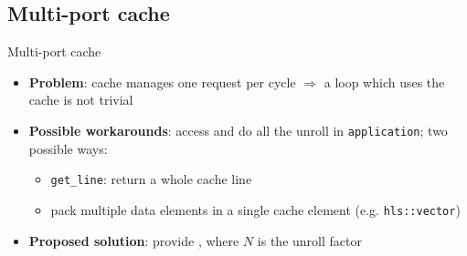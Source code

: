 \documentclass[handout,aspectratio=169]{beamer}
\begin{document}
\subsection{Multi-port cache}
\begin{frame}{Multi-port cache}
	\begin{itemize}[<+->]
		\item \textbf{Problem}: cache manages one request per cycle
			$\Rightarrow$  a loop which uses the cache is not
			trivial
		\item \textbf{Possible workarounds}:
			access 
			and do all the unroll in \texttt{application}; two possible ways:
			\begin{itemize}[<.->]
				\item \texttt{get\_line}: return a whole cache
					line
				\item pack multiple data elements in a single
					cache element (e.g. \texttt{hls::vector})
			\end{itemize}
		\item \textbf{Proposed solution}: provide ,
			where $N$ is the unroll factor
	\end{itemize}
\end{frame}
\end{document}
